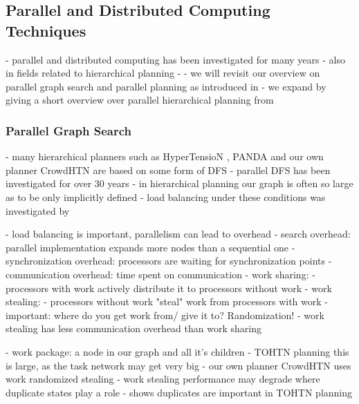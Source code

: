 \subsection{Parallel and Distributed Computing Techniques}
- parallel and distributed computing has been investigated for many years
- also in fields related to hierarchical planning
- 
- we will revisit our overview on parallel graph search and parallel planning as introduced in \cite{bretl2021parallel}
- we expand by giving a short overview over parallel hierarchical planning from \cite{bretl2021parallel}

\subsubsection{Parallel Graph Search}
- many hierarchical planners such as HyperTensioN \cite{magnaguagno2020hypertension}, PANDA \cite{holler2020htn} and our own planner CrowdHTN \cite{bretl2021parallel} are based on some form of DFS
- parallel DFS has been investigated for over 30 years \cite{rao1987parallel, kumar1987parallel}
- in hierarchical planning our graph is often so large as to be only implicitly defined
- load balancing under these conditions was investigated by \cite{sanders1997lastverteilungsalgorithmen}

- load balancing is important, parallelism can lead to overhead \cite{fukunaga2018parallel}
	- search overhead: parallel implementation expands more nodes than a sequential one
	- synchronization overhead: processors are waiting for synchronization points
	- communication overhead: time spent on communication
- work sharing:
	- processors with work actively distribute it to processors without work
- work stealing:
	- processors without work "steal" work from processors with work
- important: where do you get work from/ give it to? Randomization!
- work stealing has less communication overhead than work sharing \cite{blumofe1999scheduling}

- work package: a node in our graph and all it's children
- TOHTN planning this is large, as the task network may get very big
- our own planner CrowdHTN uses work randomized stealing
- work stealing performance may degrade where duplicate states play a role \cite{fukunaga2018parallel}
- \cite{holler2021loop} shows duplicates are important in TOHTN planning

